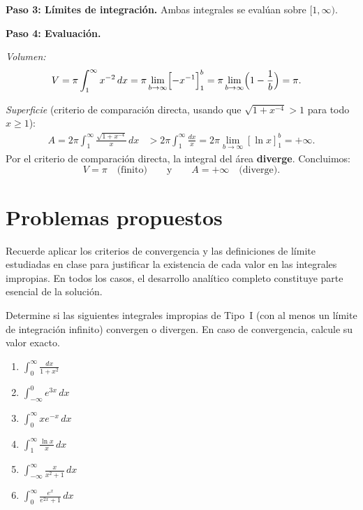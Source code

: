 \begin{example}
\begin{myproof}
\textbf{Paso 3: Límites de integración.}
Ambas integrales se evalúan sobre $[1,\infty)$.

\textbf{Paso 4: Evaluación.}

\textit{Volumen:}
\begin{align*}
V &= \pi\int_1^\infty x^{-2}\,dx
   = \pi\lim_{b\to\infty}\Bigl[-x^{-1}\Bigr]_1^b
   = \pi\lim_{b\to\infty}\Bigl(1-\frac{1}{b}\Bigr)
   = \pi.
\end{align*}

\textit{Superficie} (criterio de comparación directa, usando que
$\sqrt{1+x^{-4}}>1$ para todo $x\geq 1$):
\begin{align*}
A = 2\pi\int_1^\infty\frac{\sqrt{1+x^{-4}}}{x}\,dx
  &> 2\pi\int_1^\infty\frac{dx}{x}
   = 2\pi\lim_{b\to\infty}[\ln x]_1^b
   = +\infty.
\end{align*}
Por el criterio de comparación directa, la integral del área \textbf{diverge}. Concluimos:
\[
  \boxed{V = \pi \quad \text{(finito)} \qquad \text{y} \qquad A = +\infty \quad \text{(diverge).}}
\]
\end{myproof}
\end{example}

\section{Problemas propuestos}

Recuerde aplicar los criterios de convergencia y las definiciones de límite
estudiadas en clase para justificar la existencia de cada valor en las
integrales impropias. En todos los casos, el desarrollo analítico completo
constituye parte esencial de la solución.



\begin{prob}
Determine si las siguientes integrales impropias de Tipo~I (con al menos
un límite de integración infinito) convergen o divergen. En caso de
convergencia, calcule su valor exacto.
\begin{enumerate}
    \item $\displaystyle \int_{0}^{\infty} \frac{dx}{1 + x^2}$
    \item $\displaystyle \int_{-\infty}^{0} e^{3x} \, dx$
    \item $\displaystyle \int_{0}^{\infty} x e^{-x} \, dx$
    \item $\displaystyle \int_{1}^{\infty} \frac{\ln x}{x} \, dx$
    \item $\displaystyle \int_{-\infty}^{\infty} \frac{x}{x^2 + 1} \, dx$
    \item $\displaystyle \int_{0}^{\infty} \frac{e^{x}}{e^{2x} + 1} \, dx$
\end{enumerate}
\end{prob}

